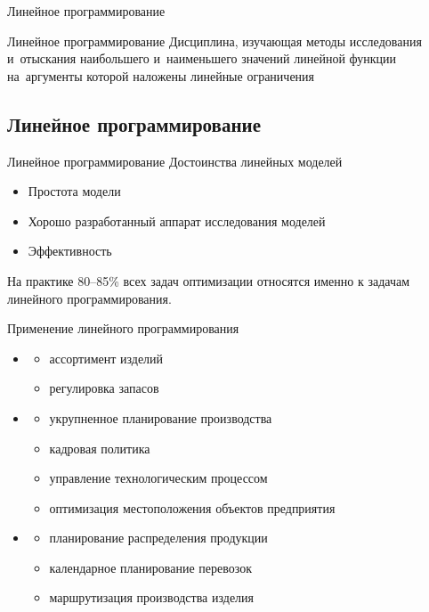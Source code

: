 \documentclass[unicode,11pt,notheorems]{beamer}
\begin{document}
\begin{frame}[t]{}{}
	\vspace{2cm}
	{\LARGE Линейное программирование\par}
	\vspace{\fill}
	
	{\begin{alertblock}{Линейное программирование}
			Дисциплина, изучающая методы исследования и~отыскания наибольшего и~наименьшего значений линейной функции на~аргументы которой наложены линейные ограничения
		\end{alertblock}}
	\end{frame}   
	
	\subsection{Линейное программирование}
	\begin{frame}{Линейное программирование}{}
		Достоинства линейных моделей
		\begin{itemize}
			\item Простота модели
			\item Хорошо разработанный аппарат исследования моделей
			\item Эффективность
		\end{itemize}
		\begin{block}{}
			На практике 80--85\% всех задач оптимизации относятся именно к задачам линейного программирования.
		\end{block}
	\end{frame}   
	
	\begin{frame}{Применение линейного программирования}
		\begin{itemize}
			\item {} 
			\begin{itemize}
				\item ассортимент изделий
				\item регулировка запасов
			\end{itemize}
			\item {} 
			\begin{itemize}
				\item укрупненное планирование производства
				\item кадровая политика
				\item управление технологическим процессом
				\item оптимизация местоположения объектов предприятия
			\end{itemize}
			\item {} 
			\begin{itemize}
				\item планирование распределения продукции
				\item календарное планирование перевозок
				\item маршрутизация производства изделия
			\end{itemize}
		\end{itemize}
	\end{frame}
	
\end{document}
